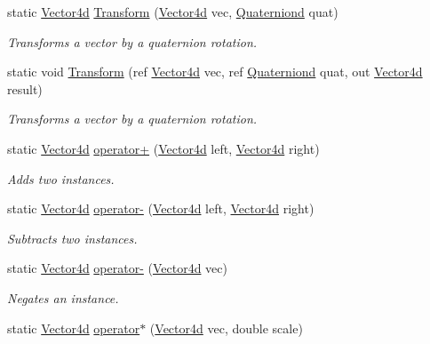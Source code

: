 \begin{DoxyCompactItemize}
static \hyperlink{struct_open_t_k_1_1_vector4d}{Vector4d} \hyperlink{struct_open_t_k_1_1_vector4d_ad28d990d401ca22fa44abe218d8af2d6}{Transform} (\hyperlink{struct_open_t_k_1_1_vector4d}{Vector4d} vec, \hyperlink{struct_open_t_k_1_1_quaterniond}{Quaterniond} quat)
\begin{DoxyCompactList}\small\item\em Transforms a vector by a quaternion rotation. \end{DoxyCompactList}\item 
static void \hyperlink{struct_open_t_k_1_1_vector4d_a0c7eee1cee688d603eb2e3df9260e858}{Transform} (ref \hyperlink{struct_open_t_k_1_1_vector4d}{Vector4d} vec, ref \hyperlink{struct_open_t_k_1_1_quaterniond}{Quaterniond} quat, out \hyperlink{struct_open_t_k_1_1_vector4d}{Vector4d} result)
\begin{DoxyCompactList}\small\item\em Transforms a vector by a quaternion rotation. \end{DoxyCompactList}\item 
static \hyperlink{struct_open_t_k_1_1_vector4d}{Vector4d} \hyperlink{struct_open_t_k_1_1_vector4d_ad78d4f7a5ba5e765df14e4625ce6fdf1}{operator+} (\hyperlink{struct_open_t_k_1_1_vector4d}{Vector4d} left, \hyperlink{struct_open_t_k_1_1_vector4d}{Vector4d} right)
\begin{DoxyCompactList}\small\item\em Adds two instances. \end{DoxyCompactList}\item 
static \hyperlink{struct_open_t_k_1_1_vector4d}{Vector4d} \hyperlink{struct_open_t_k_1_1_vector4d_a85276a8d598ebb0a55f95cdc9dd9a412}{operator-\/} (\hyperlink{struct_open_t_k_1_1_vector4d}{Vector4d} left, \hyperlink{struct_open_t_k_1_1_vector4d}{Vector4d} right)
\begin{DoxyCompactList}\small\item\em Subtracts two instances. \end{DoxyCompactList}\item 
static \hyperlink{struct_open_t_k_1_1_vector4d}{Vector4d} \hyperlink{struct_open_t_k_1_1_vector4d_a1623c104303c69f3c587fd505b739d4f}{operator-\/} (\hyperlink{struct_open_t_k_1_1_vector4d}{Vector4d} vec)
\begin{DoxyCompactList}\small\item\em Negates an instance. \end{DoxyCompactList}\item 
static \hyperlink{struct_open_t_k_1_1_vector4d}{Vector4d} \hyperlink{struct_open_t_k_1_1_vector4d_a337a14c0a20d87ea618fe8ed2355e323}{operator$\ast$} (\hyperlink{struct_open_t_k_1_1_vector4d}{Vector4d} vec, double scale)

\end{DoxyCompactItemize}
